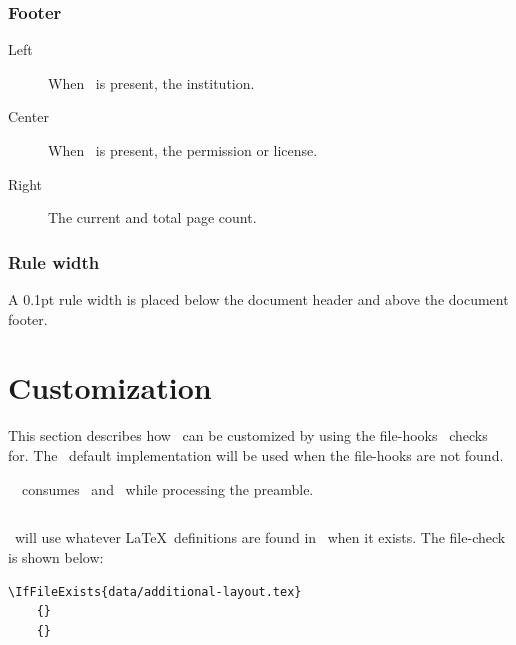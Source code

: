 \documentclass[12pt]{tlc-article}
\begin{document}

\subsubsection*{Footer}
\begin{description}
  \item[Left] When \tlcVE\ is present, the institution.
  \item[Center] When \tlcVE\ is present, the permission or license.
  \item[Right] The current and total page count.
\end{description}


\subsubsection*{Rule width}
A 0.1pt rule width is placed below the document header and above the document
footer.


\clearpage
\section{Customization}
This section describes how \tlcA\ can be customized by using the file-hooks
\tlcA\ checks for.  The \tlcA\ default implementation will be used when the
file-hooks are not found.

\tlcVspace

\tlcNote\ \tlcA\ consumes \tlcAL\ and \tlcHF\ while processing the preamble.


\subsection{\tlcAL}
\tlcA\ will use whatever \LaTeX\ definitions are found in \tlcAL\ when it
exists.  The file-check is shown below:

\begin{lstlisting}[basicstyle=\ttfamily\tiny]
  \IfFileExists{data/additional-layout.tex}
    {}
    {}
\end{lstlisting}
\end{document}
